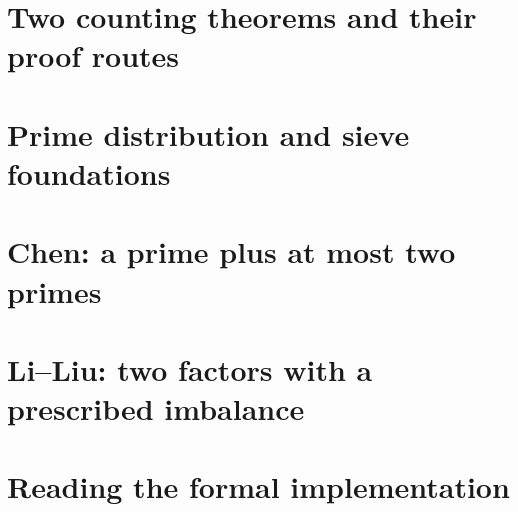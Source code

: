

\chapter{Two counting theorems and their proof routes}\label{chap:overview}


\chapter{Prime distribution and sieve foundations}\label{chap:foundations}


\chapter{Chen: a prime plus at most two primes}\label{chap:chen}


\chapter{Li--Liu: two factors with a prescribed imbalance}\label{chap:liliu}


\chapter{Reading the formal implementation}\label{chap:implementation}

